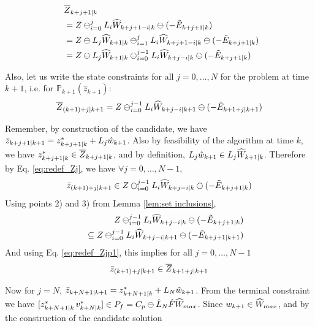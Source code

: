 \begin{subequations}
\label{eq:redef_Zj}
\begin{align}
& \overline{Z}_{k+j+1|k} \nonumber
\\
\; \; &= Z \ominus_{i=0}^{j}L_i\widehat{W}_{k+j+1-i|k} \ominus (-\tilde{E}_{k+j+1|k}) \nonumber \\
 &= Z \ominus L_j \widehat{W}_{k+1|k} \ominus_{i=1}^{j}L_i\widehat{W}_{k+j+1-i|k} \ominus (-\tilde{E}_{k+j+1|k}) \nonumber\\
 &= Z \ominus L_j \widehat{W}_{k+1|k} \ominus_{i=0}^{j-1}L_i\widehat{W}_{k+j-i|k} \ominus (-\tilde{E}_{k+j+1|k}) \nonumber
\end{align}
\end{subequations}


Also, let us write the state constraints for all $j=0,\dotsc,N$ for the problem at time $k+1$, i.e. for $\mathbb{P}_{k+1}(\hat{z}_{k+1})$:
\begin{equation*}
\label{eq:redef_Zjp1}
\overline{Z}_{(k+1)+j|k+1} = Z \ominus_{i=0}^{j-1}L_i\widehat{W}_{k+j-i|k+1} \ominus (-\tilde{E}_{k+1+j|k+1}) \\
\end{equation*}

Remember, by construction of the candidate, we have $\bar{z}_{k+j+1|k+1} = z^{*}_{k+j+1|k} + L_j\hat{w}_{k+1}$.
Also by feasibility of the algorithm at time $k$, we have $z^{*}_{k+j+1|k}\in \overline{Z}_{k+j+1|k}$, and by definition, $L_j\hat{w}_{k+1} \in L_j\widehat{W}_{k+1|k}$. 
Therefore by Eq. \eqref{eq:redef_Zj}, we have $\forall j=0,\dotsc,N-1$,
\begin{equation}
\bar{z}_{(k+1)+j|k+1} \in Z \ominus_{i=0}^{j-1}L_i\widehat{W}_{k+j-i|k} \ominus (-\tilde{E}_{k+j+1|k}) \\
\end{equation}
Using points 2) and 3) from Lemma \ref{lem:set inclusions},
\begin{eqnarray*}
&&Z \ominus_{i=0}^{j-1}L_i\widehat{W}_{k+j-i|k} \ominus (-\tilde{E}_{k+j+1|k})
\nonumber
\\
&&\;\;  \subseteq Z \ominus_{i=0}^{j-1}L_i\widehat{W}_{k+j-i|k+1}  \ominus (-\tilde{E}_{k+j+1|k+1}) 
\end{eqnarray*}
And using Eq. \eqref{eq:redef_Zjp1}, this implies for all $j=0,\dotsc,N-1$
\[\bar{z}_{(k+1)+j|k+1} \in \overline{Z}_{k+1+j|k+1}\]

Now for $j=N$, $\bar{z}_{k+N+1|k+1} = z^{*}_{k+N+1|k} + L_N\hat{w}_{k+1}$. 
From the terminal constraint we have $[z^{*}_{k+N+1|k}\, v^{*}_{k+N|k}] \in P_f = C_p \ominus \hat{L}_N\hat{F}\widehat{W}_{max}$. Since $w_{k+1} \in \widehat{W}_{max}$, and by the construction of the candidate solution

